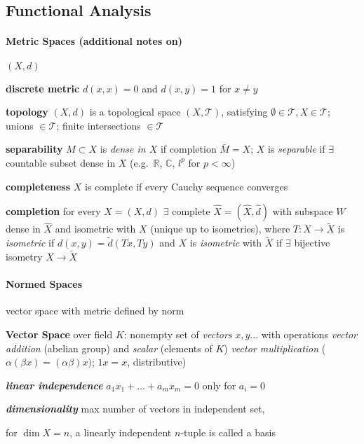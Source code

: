 \documentclass[8pt,twoside]{extarticle}
\begin{document}
\subsection[Functional Analysis]{Functional Analysis \citep{kreyszig1991introductory}}

\begin{multicols}{2}

\paragraph{Metric Spaces (additional notes on)} $(X,d)$

\textbf{discrete metric} $d(x,x)=0$ and $d(x,y)=1$ for $x\neq y$

\textbf{topology} $(X,d)$ is a topological space $(X, \mathscr{T})$, satisfying $\emptyset\in\mathscr{T}, X\in\mathscr{T}$; unions $\in\mathscr{T}$; finite intersections $\in\mathscr{T}$

\textbf{separability} $M\subset X$ is \textit{dense in $X$} if completion $\bar{M}=X$; 
$X$ is \textit{separable} if $\exists$ countable subset dense in $X$ (e.g.\ $\mathbb{R}$, $\mathbb{C}$, $l^p$ for $p{<}\infty$)

\textbf{completeness} $X$ is complete if every Cauchy sequence converges

\textbf{completion} for every $X=(X,d)$ $\exists$ complete $\hat{X}=(\hat{X}, \hat{d})$ with subspace $W$ dense in $\hat{X}$ and isometric with $X$ (unique up to isometries), where $T:X\to \tilde{X}$ is \textit{isometric} if $d(x,y)=\tilde{d}(Tx, Ty)$ and $X$ is \textit{isometric} with $\tilde{X}$ if $\exists$ bijective isometry $X\to \tilde{X}$

\paragraph{Normed Spaces} vector space with metric defined by norm

\textbf{Vector Space} over field $K$: nonempty set of \textit{vectors} $x,y...$ with operations \textit{vector addition} (abelian group) and \textit{scalar} (elements of $K$) \textit{vector multiplication} ($\alpha(\beta x){=} (\alpha\beta)x)$; $1x{=}x$, distributive)

\textbf{\textit{linear independence}} $a_1x_1+...+a_mx_m= 0$ only for $a_i=0$

\textbf{\textit{dimensionality}} max number of vectors in independent set, 

for $\dim X=n$, a linearly independent $n$-tuple is called a basis


\end{multicols}
\end{document}
